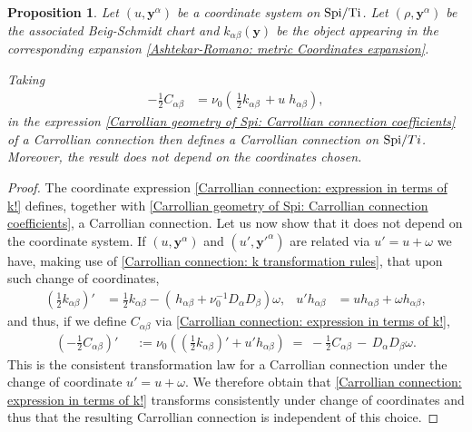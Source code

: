 \documentclass[a4paper, 10pt]{article}
\newtheorem{proposition}{Proposition}[section]
\theoremstyle{remark}
\newcommand{\Ti}{\textnormal{Ti}}
\newcommand{\Spi}{\textnormal{Spi}}
\newcommand{\y}{\bm{y}}
\begin{document}
\begin{proposition}\label{Proposition: Carrollian connection}
    Let $(u, \y^{\alpha})$ be a coordinate system on $\Spi/\Ti$.  Let $( \rho, \y^{\alpha})$ be the associated Beig-Schmidt chart and $k_{\alpha\beta}(\y)$ be the object appearing in the corresponding expansion \eqref{Ashtekar-Romano: metric Coordinates expansion}.
    
    Taking    \begin{align}\label{Carrollian connection: expression in terms of k!}
        -\frac{1}{2}C_{\alpha\beta} &= \nu_0\left(\,  \frac{1}{2} k_{\alpha\beta}\, + u\;  h_{\alpha \beta}\right),
    \end{align}
    in the expression \eqref{Carrollian geometry of Spi: Carrollian connection coefficients} of a Carrollian connection then defines a Carrollian connection on $\Spi/Ti$. Moreover, the result does not depend on the coordinates chosen.
\end{proposition}
\begin{proof} \mbox{} 

The coordinate expression \eqref{Carrollian connection: expression in terms of k!} defines, together with \eqref{Carrollian geometry of Spi: Carrollian connection coefficients}, a Carrollian connection. Let us now show that it does not depend on the coordinate system. If $(u, {\y}^{\alpha})$ and $(u', {\y'}^{\alpha})$  are related via $u' = u+\omega$ we have, making use of \eqref{Carrollian connection: k transformation rules}, that upon such change of coordinates,
\begin{align*}
    \left(\frac{1}{2}k_{\alpha \beta}\right)' &= \frac{1}{2}k_{\alpha \beta}  - ( \,h_{\alpha \beta} + \nu_0^{-1} D_{\alpha}D_{\beta})\omega, & u' h_{\alpha \beta} &= u h_{\alpha \beta} + \omega h_{\alpha \beta},
\end{align*}
and thus, if we define $C_{\alpha \beta}$ via \eqref{Carrollian connection: expression in terms of k!},
\begin{align*}
   (-\frac{1}{2}C_{\alpha \beta})' \;&\;:= \nu_0\left( (\frac{1}{2}k_{\alpha \beta})' + u'  h_{\alpha \beta}\right) \; =\; -\frac{1}{2}C_{\alpha \beta}  \,-\,D_{\alpha}D_{\beta}\omega.
\end{align*}
This is the consistent transformation law for a Carrollian connection under the change of coordinate $u'= u+\omega$. We therefore obtain that \eqref{Carrollian connection: expression in terms of k!} transforms consistently under change of coordinates and thus that the resulting Carrollian connection is independent of this choice.
\end{proof}
\end{document}
